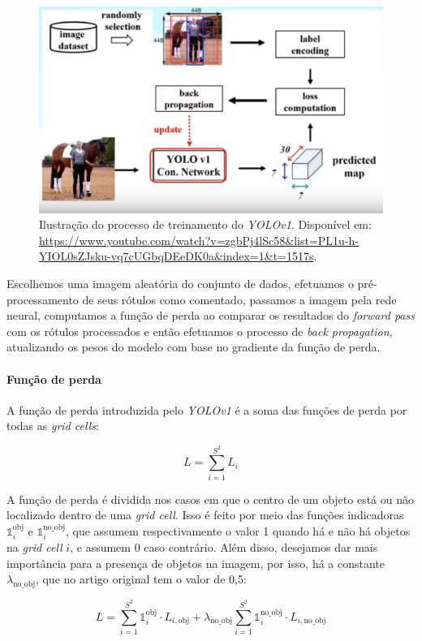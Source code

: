 \begin{figure}[htb!]
    \centering
    \includegraphics[width=0.8\linewidth]{images/yolo_train.png}
    \caption{\label{fig:yolo_train} Ilustração do processo de treinamento do \emph{YOLOv1}. Disponível em: \url{https://www.youtube.com/watch?v=zgbPj4lSc58&list=PL1u-h-YIOL0sZJsku-vq7cUGbqDEeDK0a&index=1&t=1517s}.}
\end{figure}

Escolhemos uma imagem aleatória do conjunto de dados, efetuamos o pré-processamento de seus rótulos como comentado, passamos a imagem pela rede neural, computamos a função de perda ao comparar os resultados do \emph{forward pass} com os rótulos processados e então efetuamos o processo de \emph{back propagation}, atualizando os pesos do modelo com base no gradiente da função de perda. 

\paragraph{Função de perda}
A função de perda introduzida pelo \emph{YOLOv1} é a soma das funções de perda por todas as \emph{grid cells}:
\begin{center}
\[
L = \sum_{i=1}^{S^2} L_i
\]
\end{center}
A função de perda é dividida nos casos em que o centro de um objeto está ou não localizado dentro de uma \emph{grid cell}. Isso é feito por meio das funções indicadoras $\mathds{1}_i^{\text{obj}}$ e $\mathds{1}_i^{\text{no\_obj}}$, que assumem respectivamente o valor 1 quando há e não há objetos na \emph{grid cell} $i$, e assumem 0 caso contrário. Além disso, desejamos dar mais importância para a presença de objetos na imagem, por isso, há a constante $\lambda_{\text{no\_obj}}$, que no artigo original tem o valor de 0,5:
\begin{center}
\[
L = \sum_{i=1}^{S^2} \mathds{1}_i^{\text{obj}} \cdot L_{i, \text{obj}} + \lambda_{\text{no\_obj}} \sum_{i=1}^{S^2} \mathds{1}_i^{\text{no\_obj}} \cdot L_{i, \text{no\_obj}}
\]
\end{center}

